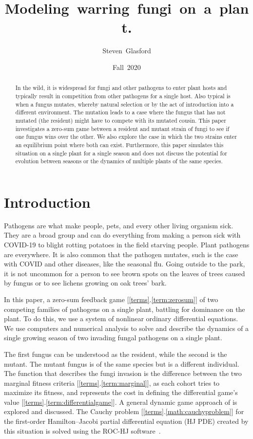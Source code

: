\documentclass[11pt]{amsart}
\author{Steven~Glasford}
\title{Modeling~warring~fungi~on~a~plant.}
\begin{document}
\date{Fall~2020}

\maketitle

\begin{abstract}
    In the wild, it is widespread for fungi and other pathogens to enter plant hosts and typically result in competition from other pathogens for a single host. Also typical is when a fungus mutates, whereby natural selection or by the act of introduction into a different environment. The mutation leads to a case where the fungus that has not mutated (the resident) might have to compete with its mutated cousin.
    This paper investigates a zero-sum game between a resident and mutant strain of fungi to see if one fungus wins over the other. We also explore the case in which the two strains enter an equilibrium point where both can exist. Furthermore, this paper simulates this situation on a single plant for a single season and does not discuss the potential for evolution between seasons or the dynamics of multiple plants of the same species.
\end{abstract}


\section{Introduction}
Pathogens are what make people, pets, and every other living organism sick. They are a broad group and can do everything from making a person sick with COVID-19 to blight rotting potatoes in the field starving people. Plant pathogens are everywhere. It is also common that the pathogen mutates, such is the case with COVID and other diseases, like the seasonal flu. Going outside to the park, it is not uncommon for a person to see brown spots on the leaves of trees caused by fungus or to see lichens growing on oak trees' bark. 

In this paper, a zero-sum feedback game [\ref{terms}.\ref{term:zerosum}] of two competing families of pathogens on a single plant, battling for dominance on the plant. To do this, we use a system of nonlinear ordinary differential equations. We use computers and numerical analysis to solve and describe the dynamics of a single growing season of two invading fungal pathogens on a single plant.

The first fungus can be understood as the resident, while the second is the mutant. The mutant fungus is of the same species but is a different individual.  The function that describes the fungi invasion is the difference between the two marginal fitness criteria [\ref{terms}.\ref{term:marginal}], as each cohort tries to maximize its fitness, and represents the cost in defining the  differential game's value [\ref{terms}.\ref{term:differentialgame}].  A general dynamic game approach of \cite{YegorovGrognardMailleretHalkettBernhard2019} is explored and discussed. The Cauchy problem [\ref{terms}.\ref{math:cauchyproblem}] for the first-order Hamilton--Jacobi partial differential equation (HJ PDE) created by this situation is solved using the ROC-HJ software~\cite{ROCHJ2019}. 
\end{document}
